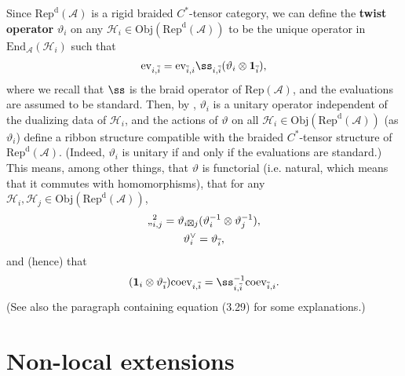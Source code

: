 \documentclass[12pt,a4paper]{article}
\theoremstyle{definition}
\theoremstyle{plain}
\newcommand{\mc}{\mathcal}
\newcommand{\ovl}{\overline}
\newcommand{\End}{\mathrm{End}} %
\newcommand{\id}{\mathbf{1}}
\newcommand{\ev}{\mathrm{ev}}
\newcommand{\coev}{\mathrm{coev}}
\newcommand{\RepA}{\mathrm{Rep}(\mc A)}
\newcommand{\RepdA}{\mathrm{Rep}^{\mathrm d}(\mc A)}
\newcommand{\Obj}{\mathrm{Obj}}
\numberwithin{equation}{section}
\begin{document}

Since $\RepdA$ is a rigid braided $C^*$-tensor category, we can define the \textbf{twist operator} $\vartheta_i$ on any $\mc H_i\in\Obj(\RepdA)$ to be the unique operator in $\End_{\mc A}(\mc H_i)$ such that 
\begin{align}
	\ev_{i,\ovl i}=\ev_{\ovl i,i}\ss_{i,\ovl i}(\vartheta_i\otimes\id_{\ovl i}),\label{eq33}
\end{align}
where we recall that $\ss$ is the braid operator of $\RepA$, and the evaluations are assumed to be standard. Then, by \cite{Mueg00},  $\vartheta_i$ is a unitary operator independent of the dualizing data of $\mc H_i$, and the actions of $\vartheta$ on all $\mc H_i\in\Obj(\RepdA)$ (as $\vartheta_i$) define a ribbon structure compatible with the braided $C^*$-tensor structure of $\RepdA$. (Indeed, $\vartheta_i$ is unitary if and only if the evaluations are standard.)  This means, among other things, that $\vartheta$ is functorial (i.e. natural, which means that it  commutes with homomorphisms),  that for any $\mc H_i,\mc H_j\in\Obj(\RepdA)$,
\begin{gather}
	\ss_{i,j}^2=\vartheta_{i\boxtimes j}(\vartheta_i^{-1}\otimes\vartheta_j^{-1}),\label{eq32}\\
	\vartheta_i^\vee=\vartheta_{\ovl i},
\end{gather}
and (hence) that
\begin{align}
	(\id_i\otimes\vartheta_{\ovl i})\coev_{i,\ovl i}=\ss_{i,\ovl i}^{-1}\coev_{\ovl i,i}.\label{eq15}
\end{align}
(See also \cite{Gui21b} the paragraph containing equation (3.29) for some explanations.)


\section{Non-local extensions}\label{lb34}
\end{document}

